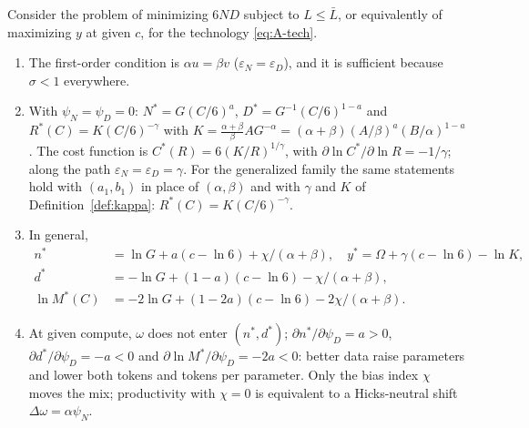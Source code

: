 \begin{lemma}\label{lem:alloc}
Consider the problem of minimizing $6ND$ subject to $L\le\bar L$, or equivalently of maximizing $y$ at given $c$, for
the technology \eqref{eq:A-tech}.
\begin{enumerate}
\item[(i)] The first-order condition is $\alpha u=\beta v$ ($\varepsilon_N=\varepsilon_D$), and it is sufficient because
$\sigma<1$ everywhere.
\item[(ii)] With $\psi_N=\psi_D=0$: $N^*=G(C/6)^{a}$, $D^*=G^{-1}(C/6)^{1-a}$ and $R^*(C)=K(C/6)^{-\gamma}$ with
$K=\frac{\alpha+\beta}{\beta}AG^{-\alpha}=(\alpha+\beta)(A/\beta)^{a}(B/\alpha)^{1-a}$. The cost function is
$C^*(R)=6(K/R)^{1/\gamma}$, with $\partial\ln C^*/\partial\ln R=-1/\gamma$; along the path
$\varepsilon_N=\varepsilon_D=\gamma$. For the generalized family the same statements hold with $(a_1,b_1)$ in place of
$(\alpha,\beta)$ and with $\gamma$ and $K$ of Definition~\ref{def:kappa}: $R^*(C)=K(C/6)^{-\gamma}$.
\item[(iii)] In general,
\begin{align*}
n^*&=\ln G+a(c-\ln6)+\chi/(\alpha+\beta),\quad y^*=\Omega+\gamma(c-\ln6)-\ln K,\\
d^*&=-\ln G+(1-a)(c-\ln6)-\chi/(\alpha+\beta),\\
\ln M^*(C)&=-2\ln G+(1-2a)(c-\ln6)-2\chi/(\alpha+\beta).
\end{align*}
\item[(iv)] At given compute, $\omega$ does not enter $(n^*,d^*)$; $\partial n^*/\partial\psi_D=a>0$,
$\partial d^*/\partial\psi_D=-a<0$ and $\partial\ln M^*/\partial\psi_D=-2a<0$: better data raise parameters and lower
both tokens and tokens per parameter. Only the bias index $\chi$ moves the mix; productivity with $\chi=0$ is equivalent
to a Hicks-neutral shift $\Delta\omega=\alpha\psi_N$.
\end{enumerate}
\end{lemma}

